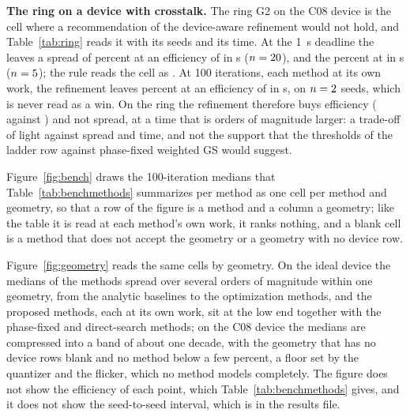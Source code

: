 
{\let\footnotesize\scriptsize\setlength{\tabcolsep}{1pt}}

\textbf{The ring on a device with crosstalk.} The ring G2 on the C08 device is the cell where a recommendation of the device-aware refinement would not hold, and Table~\ref{tab:ring} reads it with its seeds and its time. At the 1~s deadline the \ringTimePubMethod{} leaves a spread of \ringTimePubSigma{} percent at an efficiency of \ringTimePubEff{} in \ringTimePubSec{} s ($n=20{}$), and the \ringTimeBOneMethod{} \ringTimeBOneSigma{} percent at \ringTimeBOneEff{} in \ringTimeBOneSec{} s ($n=5{}$); the rule reads the cell as \ringTimeReading{}. At 100 iterations, each method at its own work, the refinement leaves \ringIterBOneSigma{} percent at an efficiency of \ringIterBOneEff{} in \ringIterBOneSec{} s, on $n=2{}$ seeds, which is never read as a win. On the ring the refinement therefore buys efficiency (\ringTimeBOneEff{} against \ringTimePubEff{}) and not spread, at a time that is orders of magnitude larger: a trade-off of light against spread and time, and not the support that the thresholds of the ladder row against phase-fixed weighted GS would suggest.

Figure~\ref{fig:bench} draws the 100-iteration medians that Table~\ref{tab:benchmethods} summarizes per method as one cell per method and geometry, so that a row of the figure is a method and a column a geometry; like the table it is read at each method's own work, it ranks nothing, and a blank cell is a method that does not accept the geometry or a geometry with no device row.

\clearpage

Figure~\ref{fig:geometry} reads the same cells by geometry. On the ideal device the medians of the methods spread over several orders of magnitude within one geometry, from the analytic baselines to the optimization methods, and the proposed methods, each at its own work, sit at the low end together with the phase-fixed and direct-search methods; on the C08 device the medians are compressed into a band of about one decade, with the geometry that has no device rows blank and no method below a few percent, a floor set by the quantizer and the flicker, which no method models completely. The figure does not show the efficiency of each point, which Table~\ref{tab:benchmethods} gives, and it does not show the seed-to-seed interval, which is in the results file.

